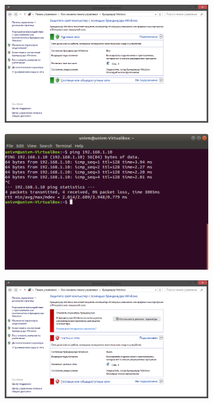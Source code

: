 \documentclass[
	a4paper,
	oneside,
	BCOR = 10mm,
	DIV = 12,
	12pt,
	headings = normal,
]{scrartcl}
\newlength{\gridunitwidth}
\begin{document}
		\begin{figure}[!htbp]
			\begin{subfigure}[b]{7 \gridunitwidth - 1em / 2}
				\includegraphics[width = \columnwidth]{./assets/14-02.png}
				\caption{}
				\label{subfig:06-01}
			\end{subfigure}%
			\hspace{1em}%
			\begin{subfigure}[b]{5 \gridunitwidth - 1em / 2}
				\includegraphics[width = \columnwidth]{./assets/14-03.png}
				\caption{}
				\label{subfig:06-02}
			\end{subfigure}
			\begin{subfigure}[b]{7 \gridunitwidth - 1em / 2}
				\includegraphics[width = \columnwidth]{./assets/14-04.png}

\end{subfigure}
\end{figure}
\end{document}
